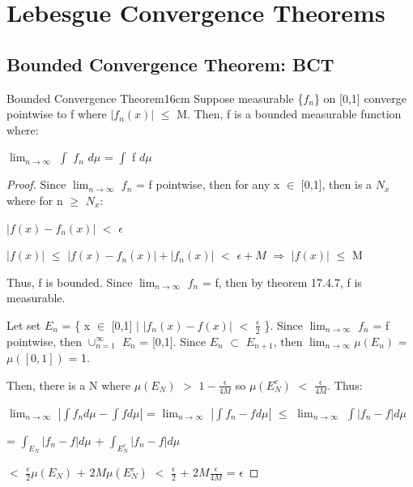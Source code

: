 \newpage

\section[Day 18: Convergence Theorems]{ Lebesgue Convergence Theorems }

\subsection{ Bounded Convergence Theorem: BCT }

    \begin{wtheorem}{Bounded Convergence Theorem}{16cm}
        Suppose measurable \{$f_n$\} on [0,1] converge pointwise to f where
        $|f_n(x)|$ $\leq$ M.
        Then, f is a bounded measurable function where:
        
        \hspace{0.5cm}
        $\lim_{n \rightarrow \infty}$ $\int$ $f_n$ $d\mu$ = $\int$ f $d\mu$
    \end{wtheorem}

    \begin{proof}
        Since $\lim_{n \rightarrow \infty}$ $f_n$ = f pointwise, then
        for any x $\in$ [0,1], then is a $N_x$ where for n $\geq$ $N_x$:

        \hspace{0.5cm}
        $|f(x) - f_n(x)|$ $<$ $\epsilon$

        \hspace{0.5cm}
        $|f(x)|$ $\leq$ $|f(x) - f_n(x)| + |f_n(x)|$ $<$ $\epsilon + M$
        \hspace{1cm}
        $\Rightarrow$
        \hspace{1cm}
        $|f(x)|$ $\leq$ M

        Thus, f is bounded.
        Since $\lim_{n \rightarrow \infty}$ $f_n$ = f, then by
        {\color{red} theorem 17.4.7}, f is measurable.

        Let set $E_n$ = \{ x $\in$ [0,1] $|$
                            $|f_n(x) - f(x)|$ $<$ $\frac{\epsilon}{2}$ \}.
        Since $\lim_{n \rightarrow \infty}$ $f_n$ = f pointwise, then
        $\cup_{n=1}^{\infty}$ $E_n$ = [0,1].
        Since $E_n$ $\subset$ $E_{n+1}$, then
        $\lim_{n \rightarrow \infty} \mu(E_n)$ = $\mu([0,1])$ = 1.

        Then, there is a N where $\mu(E_N)$ $>$ $1 - \frac{\epsilon}{4M}$
        so $\mu(E_N^c)$ $<$ $\frac{\epsilon}{4M}$. Thus:

        \hspace{0.5cm}
        $\lim_{n \rightarrow \infty}$ $|\int f_n d\mu - \int f d\mu|$
        = $\lim_{n \rightarrow \infty}$ $|\int f_n - f d\mu|$
        $\leq$ $\lim_{n \rightarrow \infty}$ $\int |f_n - f| d\mu$

        \hspace{5.25cm}
        = $\int_{E_N} |f_n - f| d\mu$ + $\int_{E_N^c} |f_n - f| d\mu$

        \hspace{5.25cm}
        $<$ $\frac{\epsilon}{2} \mu(E_N)$ + $2M \mu(E_N^c)$
        $<$ $\frac{\epsilon}{2}$ + $2M \frac{\epsilon}{4M}$
        = $\epsilon$
    \end{proof}

